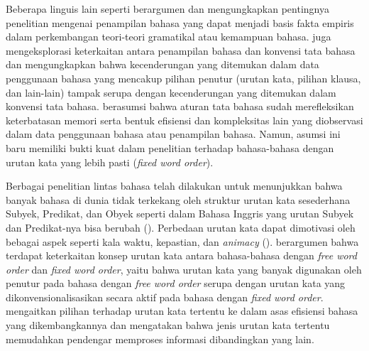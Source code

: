 Beberapa linguis lain seperti \cite{sagwasow2011pccg} berargumen dan mengungkapkan pentingnya penelitian mengenai penampilan bahasa yang dapat menjadi basis fakta empiris dalam perkembangan teori-teori gramatikal atau kemampuan bahasa. \cite{hawkins2014cross} juga mengeksplorasi keterkaitan antara penampilan bahasa dan konvensi tata bahasa dan mengungkapkan bahwa kecenderungan yang ditemukan dalam data penggunaan bahasa yang mencakup pilihan penutur (urutan kata, pilihan klausa, dan lain-lain) tampak serupa dengan kecenderungan yang ditemukan dalam konvensi tata bahasa. \cite{hawkins2014cross} berasumsi bahwa aturan tata bahasa sudah merefleksikan keterbatasan memori serta bentuk efisiensi dan kompleksitas lain yang diobservasi dalam data penggunaan bahasa atau penampilan bahasa. Namun, asumsi ini baru memiliki bukti kuat dalam penelitian terhadap bahasa-bahasa dengan urutan kata yang lebih pasti (\textit{fixed word order}). 

Berbagai penelitian lintas bahasa telah dilakukan untuk menunjukkan bahwa banyak bahasa di dunia tidak terkekang oleh struktur urutan kata sesederhana Subyek, Predikat, dan Obyek seperti dalam Bahasa Inggris yang urutan Subyek dan Predikat-nya bisa berubah (\citealp{macwhinneybates1989cross, birnerward1998noncanonical, lambrecht2000info}). Perbedaan urutan kata dapat dimotivasi oleh bebagai aspek seperti kala waktu, kepastian, dan \textit{animacy} (\citealp{dryer1992greenbergian, tsunoda1995adpositions, polinskaja1989object}).  \cite{hawkins1994performance} berargumen bahwa terdapat keterkaitan konsep urutan kata antara bahasa-bahasa dengan \textit{free word order} dan \textit{fixed word order}, yaitu bahwa urutan kata yang banyak digunakan oleh penutur pada bahasa dengan \textit{free word order} serupa dengan urutan kata yang dikonvensionalisasikan secara aktif pada bahasa dengan \textit{fixed word order}. \cite{hawkins1994performance} mengaitkan pilihan terhadap urutan kata tertentu ke dalam asas efisiensi bahasa yang dikembangkannya dan mengatakan bahwa jenis urutan kata tertentu memudahkan pendengar memproses informasi dibandingkan yang lain.

